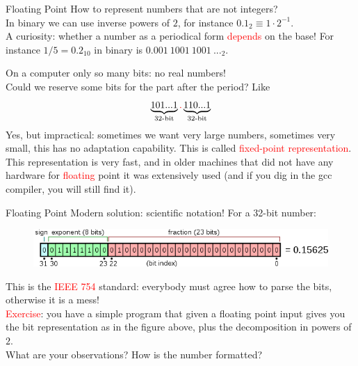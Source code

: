 \documentclass[10pt]{beamer}
\newcommand{\red}[1]{\textcolor{red}{#1}}
\renewcommand{\[}{\begin{equation*}}
\renewcommand{\]}{\end{equation*}}
\begin{document}
\begin{frame}{Floating Point}
How to represent numbers that are not integers?\\
In binary we can use inverse powers of $2$, for instance $0.1_2 \equiv 1\cdot 2^{-1}$. \\
A curiosity: whether a number as a periodical form \red{depends} on the base! For instance $1/5 = 0.2_{10}$ in binary is $0.001\ 1001\ 1001\ ..._{2}$.

On a computer only so many bits: no real numbers!\\
Could we reserve some bits for the part after the period? Like
\[
\underbrace{101...1}_{\text{32-bit}}\red{.}\underbrace{110...1}_{\text{32-bit}}
\]
Yes, but impractical: sometimes we want very large numbers, sometimes very small, this has no adaptation capability. This is called \red{fixed-point representation}.\\
This representation is very fast, and in older machines that did not have any hardware for \red{floating} point it was extensively used (and if you dig in the gcc compiler, you will still find it).
\end{frame}

\begin{frame}{Floating Point}
Modern solution: scientific notation! For a 32-bit number:
\begin{figure}
    \centering
    \includegraphics[width=\textwidth]{Notes/Figures/Float_example.png}
\end{figure}
This is the \red{IEEE 754} standard: everybody must agree how to parse the bits, otherwise it is a mess!\\


\red{Exercise}: you have a simple program that given a floating point input gives you the bit representation as in the figure above, plus the decomposition in powers of $2$. \\
What are your observations? How is the number formatted? 


\end{frame}
\end{document}
